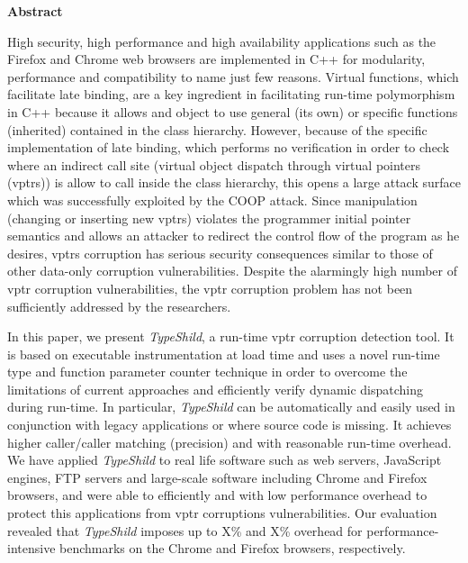 

\clearemptydoublepage
{}
{}	

\vspace*{2cm}
\begin{center}
{\Large \bf Abstract}
\end{center}
\vspace{1cm}

High security, high performance and high availability 
applications such as the Firefox and Chrome web browsers 
are implemented in C++ for modularity, performance and 
compatibility to name just few reasons.
Virtual functions, which facilitate late binding,
are a key ingredient in facilitating run-time polymorphism
in C++ because it allows and object to use general (its own) 
or specific functions (inherited) contained in the class hierarchy.
However, because of the specific implementation of late binding,
which performs no verification in order to check where an indirect call site 
(virtual object dispatch through virtual pointers (vptrs)) is allow to
call inside the class hierarchy, this opens a large attack surface which
was successfully exploited by the COOP attack.
Since manipulation (changing or inserting new vptrs) violates the 
programmer initial pointer semantics and allows an attacker to
redirect the control flow of the program as he desires, vptrs corruption
has serious security consequences similar to those of other 
data-only corruption vulnerabilities.
Despite the alarmingly high number of vptr corruption
vulnerabilities, the vptr corruption problem has not
been sufficiently addressed by the researchers.

In this paper, we present \textit{TypeShild}, a run-time vptr corruption
detection tool. It is based on executable instrumentation at load time
and uses a novel run-time type and function parameter counter technique
in order to overcome the limitations of current approaches and efficiently
verify dynamic dispatching during run-time.
In particular, \textit{TypeShild} can be automatically and easily used
in conjunction with legacy applications or where source code is missing.
It achieves higher caller/caller matching (precision) and with reasonable
run-time overhead.
We have applied \textit{TypeShild} to real life software such as
web servers, JavaScript engines, FTP servers and large-scale software
including Chrome and Firefox browsers, and were able to efficiently
and with low performance overhead to protect this applications from 
vptr corruptions vulnerabilities.
Our evaluation revealed that \textit{TypeShild} imposes up
to X\% and X\% overhead for performance-intensive
benchmarks on the Chrome and Firefox browsers, respectively.


